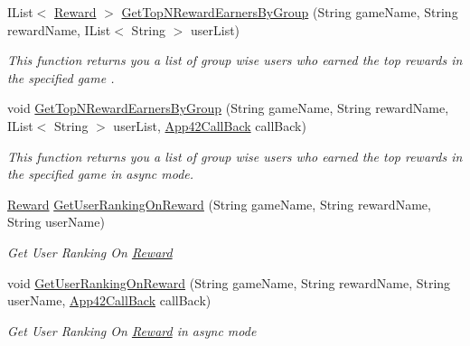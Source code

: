 \begin{DoxyCompactItemize}
I\+List$<$ \hyperlink{classcom_1_1shephertz_1_1app42_1_1paas_1_1sdk_1_1csharp_1_1reward_1_1_reward}{Reward} $>$ \hyperlink{classcom_1_1shephertz_1_1app42_1_1paas_1_1sdk_1_1csharp_1_1reward_1_1_reward_service_ae6be1491b5f8b480941cdafa8d43038b}{Get\+Top\+N\+Reward\+Earners\+By\+Group} (String game\+Name, String reward\+Name, I\+List$<$ String $>$ user\+List)
\begin{DoxyCompactList}\small\item\em This function returns you a list of group wise users who earned the top rewards in the specified game . \end{DoxyCompactList}\item 
void \hyperlink{classcom_1_1shephertz_1_1app42_1_1paas_1_1sdk_1_1csharp_1_1reward_1_1_reward_service_a07c2718835a6f33b3680860957ffb73f}{Get\+Top\+N\+Reward\+Earners\+By\+Group} (String game\+Name, String reward\+Name, I\+List$<$ String $>$ user\+List, \hyperlink{interfacecom_1_1shephertz_1_1app42_1_1paas_1_1sdk_1_1csharp_1_1_app42_call_back}{App42\+Call\+Back} call\+Back)
\begin{DoxyCompactList}\small\item\em This function returns you a list of group wise users who earned the top rewards in the specified game in async mode. \end{DoxyCompactList}\item 
\hyperlink{classcom_1_1shephertz_1_1app42_1_1paas_1_1sdk_1_1csharp_1_1reward_1_1_reward}{Reward} \hyperlink{classcom_1_1shephertz_1_1app42_1_1paas_1_1sdk_1_1csharp_1_1reward_1_1_reward_service_a731260c6e3cabcd1bb95273d11fb4ee0}{Get\+User\+Ranking\+On\+Reward} (String game\+Name, String reward\+Name, String user\+Name)
\begin{DoxyCompactList}\small\item\em Get User Ranking On \hyperlink{classcom_1_1shephertz_1_1app42_1_1paas_1_1sdk_1_1csharp_1_1reward_1_1_reward}{Reward} \end{DoxyCompactList}\item 
void \hyperlink{classcom_1_1shephertz_1_1app42_1_1paas_1_1sdk_1_1csharp_1_1reward_1_1_reward_service_a7151fc1a0de525052ea3abe9f80048a8}{Get\+User\+Ranking\+On\+Reward} (String game\+Name, String reward\+Name, String user\+Name, \hyperlink{interfacecom_1_1shephertz_1_1app42_1_1paas_1_1sdk_1_1csharp_1_1_app42_call_back}{App42\+Call\+Back} call\+Back)
\begin{DoxyCompactList}\small\item\em Get User Ranking On \hyperlink{classcom_1_1shephertz_1_1app42_1_1paas_1_1sdk_1_1csharp_1_1reward_1_1_reward}{Reward} in async mode \end{DoxyCompactList}\end{DoxyCompactItemize}
